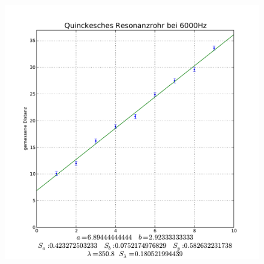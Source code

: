 \documentclass[12pt,a4paper]{article}
\begin{document}
\begin{figure}[hbt]
	\centering
	\includegraphics[width=15cm]{6000Hz}
	\label{Bild2}
\end{figure}
\end{document}
